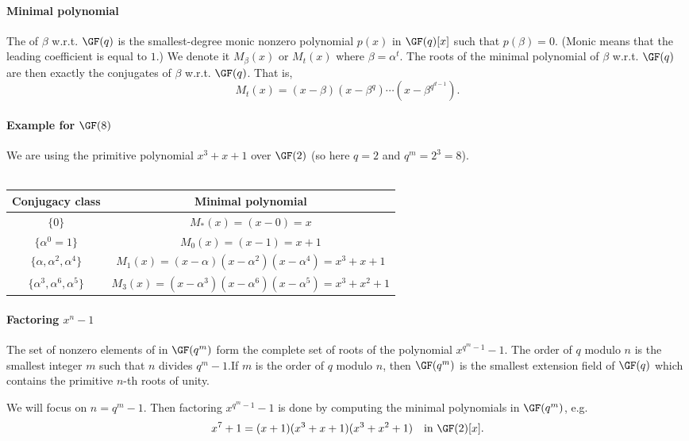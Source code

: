 \documentclass[a4paper, 11pt, openany]{book}
\begin{document}
\paragraph{Minimal polynomial} The  of $\beta$ w.r.t. $\GF(q)$ is the smallest-degree monic nonzero polynomial $p(x)$ in $\GF(q)[x]$ such that $p(\beta) = 0$. (Monic means that the leading coefficient is equal to $1$.) We denote it $M_\beta(x)$ or $M_t(x)$ where $\beta = \alpha^t$. The roots of the minimal polynomial of $\beta$ w.r.t. $\GF(q)$ are then exactly the conjugates of $\beta$ w.r.t. $\GF(q)$. That is,
\[
    M_t(x) = (x - \beta)(x - \beta^q) \cdots (x - \beta^{q^{d-1}}).
\]




\paragraph{Example for $\GF(8)$}
We are using the primitive polynomial $x^3 + x + 1$ over $\GF(2)$ (so here $q = 2$ and $q^m = 2^3 = 8$).\\
~\\
\begin{tabular}{c|c}
	Conjugacy class & Minimal polynomial\\
	\hline
	$\{0\}$ & $M_*(x) = (x - 0) = x$\\
	$\{\alpha^0 = 1\}$ & $M_0(x) = (x - 1) = x + 1$\\
	$\{\alpha, \alpha^2, \alpha^4\}$ & $M_1(x) = (x - \alpha)(x - \alpha^2)(x - \alpha^4) = x^3 + x + 1$\\
	$\{\alpha^3, \alpha^6, \alpha^5\}$ & $M_3(x) = (x - \alpha^3)(x - \alpha^6)(x - \alpha^5) = x^3 + x^2 + 1$
\end{tabular}




\paragraph{Factoring $x^n - 1$}

The set of nonzero elements of in $\GF(q^m)$ form the complete set of roots of the polynomial $x^{q^m - 1} - 1$. The order of $q$ modulo $n$ is the smallest integer $m$ such that $n$ divides $q^m - 1$.If $m$ is the order of $q$ modulo $n$, then $\GF(q^m)$ is the smallest extension field of $\GF(q)$ which contains the primitive $n$-th roots of unity.

We will focus on $n = q^m-1$. Then factoring $x^{q^m - 1} - 1$ is done by computing the minimal polynomials in $\GF(q^m)$, e.g.
\[
	x^7 + 1 = (x+1)(x^3 + x + 1)(x^3 + x^2 + 1) \quad \text{in } \GF(2)[x].
\]
\end{document}
